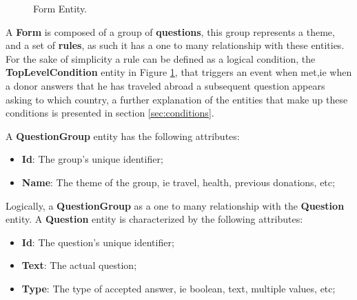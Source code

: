 \begin{figure}[h]
	\begin{center}
	\end{center}
	\caption{Form Entity.}\label{fig:form_entity}
\end{figure}

A \textbf{Form} is composed of a group of \textbf{questions}, this group represents a theme, and a set of \textbf{rules}, as such it has a one to many relationship with these entities.
For the sake of simplicity a rule can be defined as a logical condition, the \textbf{TopLevelCondition} entity in Figure \ref{fig:form_entity}, that triggers an event when met,ie when a donor answers that he has traveled abroad a subsequent question appears asking to which country, a further explanation of the entities that make up these conditions is presented in section \ref{sec:conditions}.

A \textbf{QuestionGroup} entity has the following attributes:
\begin{itemize}
	\item \textbf{Id}: The group's unique identifier;
	\item \textbf{Name}: The theme of the group, ie travel, health, previous donations, etc;
\end{itemize}

Logically, a \textbf{QuestionGroup} as a one to many relationship with the \textbf{Question} entity.
A \textbf{Question} entity is characterized by the following attributes:
\begin{itemize}
	\item \textbf{Id}: The question's unique identifier;
	\item \textbf{Text}: The actual question;
	\item \textbf{Type}: The type of accepted answer, ie boolean, text, multiple values, etc;
\end{itemize}

